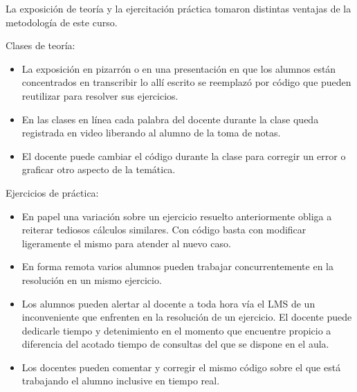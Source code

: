 La exposición de teoría y la ejercitación práctica tomaron distintas ventajas de la metodología de este curso.

Clases de teoría:
\begin{itemize}
    \item La exposición en pizarrón o en una presentación en que los alumnos están concentrados en transcribir lo allí escrito se reemplazó por código que pueden reutilizar para resolver sus ejercicios.
    \item En las clases en línea cada palabra del docente durante la clase queda registrada en video  liberando al alumno de la toma de notas.
    \item El docente puede cambiar el código durante la clase para corregir un error o graficar otro aspecto de la temática.
\end{itemize}

Ejercicios de práctica:
\begin{itemize}
    \item En papel una variación sobre un ejercicio resuelto anteriormente obliga a reiterar tediosos cálculos similares. Con código basta con modificar ligeramente el mismo para atender al nuevo caso.
    \item En forma remota varios alumnos pueden trabajar concurrentemente en la resolución en un mismo ejercicio.
    \item Los alumnos pueden alertar al docente a toda hora vía el LMS de un inconveniente que enfrenten en la resolución de un ejercicio. El docente puede dedicarle tiempo y detenimiento en el momento que encuentre propicio a diferencia del acotado tiempo de consultas del que se dispone en el aula.
    \item Los docentes pueden comentar y corregir el mismo código sobre el que está trabajando el alumno inclusive en tiempo real.
\end{itemize}
